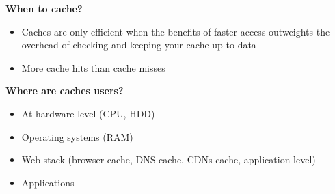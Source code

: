 \documentclass[10pt,a4paper]{article}
\begin{document}
\textbf{When to cache?}
\begin{itemize}
	\item Caches are only efficient when the benefits of faster access outweights the overhead of checking and keeping your cache up to data
	\item More cache hits than cache misses
\end{itemize}
\textbf{Where are caches users?}
\begin{itemize}
	\item At hardware level (CPU, HDD)
	\item Operating systems (RAM)
	\item Web stack (browser cache, DNS cache, CDNs cache, application level)
	\item Applications
\end{itemize}
\pagebreak
\end{document}
